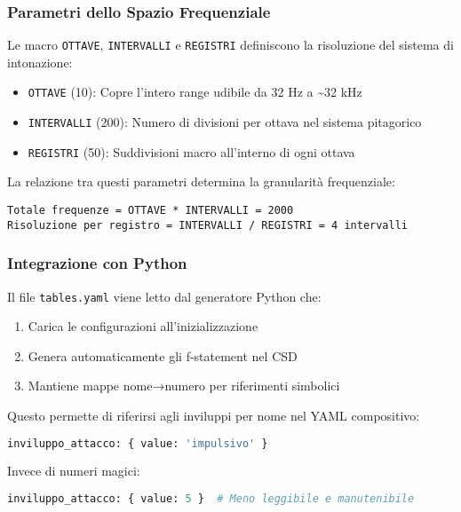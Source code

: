 \subsubsection{Parametri dello Spazio Frequenziale}
Le macro \texttt{OTTAVE}, \texttt{INTERVALLI} e \texttt{REGISTRI} definiscono la risoluzione del sistema di intonazione:

\begin{itemize}
    \item \texttt{OTTAVE} (10): Copre l'intero range udibile da 32 Hz a \textasciitilde{}32 kHz
    \item \texttt{INTERVALLI} (200): Numero di divisioni per ottava nel sistema pitagorico
    \item \texttt{REGISTRI} (50): Suddivisioni macro all'interno di ogni ottava
\end{itemize}

La relazione tra questi parametri determina la granularità frequenziale:
\begin{lstlisting}
Totale frequenze = OTTAVE * INTERVALLI = 2000
Risoluzione per registro = INTERVALLI / REGISTRI = 4 intervalli
\end{lstlisting}
\subsubsection{Integrazione con Python}
Il file \texttt{tables.yaml} viene letto dal generatore Python che:
\begin{enumerate}
    \item Carica le configurazioni all'inizializzazione
    \item Genera automaticamente gli f-statement nel CSD
    \item Mantiene mappe nome→numero per riferimenti simbolici
\end{enumerate}
Questo permette di riferirsi agli inviluppi per nome nel YAML compositivo:
\begin{lstlisting}[language=Python]
inviluppo_attacco: { value: 'impulsivo' }
\end{lstlisting}

Invece di numeri magici:
\begin{lstlisting}[language=Python]
inviluppo_attacco: { value: 5 }  # Meno leggibile e manutenibile
\end{lstlisting}